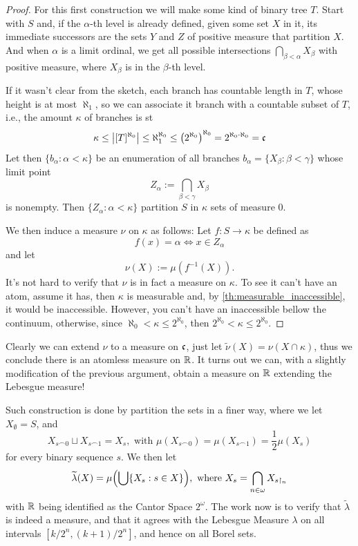 \begin{proof}
    For this first construction we will make some kind of binary tree $T$. Start with $S$ and, if the $\alpha$-th level is already defined, given some set $X$ in it, its immediate successors are the sets $Y$ and $Z$ of positive measure that partition $X$. And when $\alpha$ is a limit ordinal, we get all possible intersections $\bigcap_{\beta<\alpha}X_\beta$ with positive measure, where $X_\beta$ is in the $\beta$-th level.

    If it wasn't clear from the sketch, each branch has countable length in $T$, whose height is at most $\aleph_1$, so we can associate it branch with a countable subset of $T$, i.e., the amount $\kappa$ of branches is st
    $$\kappa\leq\left\lvert[T]^{\aleph_0}\right\rvert\leq\aleph_1^{\aleph_0}\leq{\left(2^{\aleph_0}\right)}^{\aleph_0}=2^{\aleph_0\cdot\aleph_0}=\mathfrak{c}$$
    Let then $\{b_\alpha:\alpha<\kappa\}$ be an enumeration of all branches $b_\alpha=\{X_\beta:\beta<\gamma\}$ whose limit point
    $$Z_\alpha:=\bigcap_{\beta<\gamma}X_\beta$$
    is nonempty. Then $\{Z_\alpha:\alpha<\kappa\}$ partition $S$ in $\kappa$ sets of measure $0$.
    
    We then induce a measure $\nu$ on $\kappa$ as follows: Let $f:S\to\kappa$ be defined as
    $$f(x)=\alpha\iff x\in Z_\alpha$$
    and let
    $$\nu(X):=\mu(f^{-1}(X)).$$
    It's not hard to verify that $\nu$ is in fact a measure on $\kappa$. To see it can't have an atom, assume it has, then $\kappa$ is measurable and, by \cref{th:measurable_inaccessible}, it would be inaccessible. However, you can't have an inaccessible bellow the continuum, otherwise, since $\aleph_0<\kappa\leq2^{\aleph_0}$, then $2^{\aleph_0}<\kappa\leq2^{\aleph_0}$.
\end{proof}

Clearly we can extend $\nu$ to a measure on $\mathfrak{c}$, just let $\widetilde{\nu}(X)=\nu(X\cap\kappa)$, thus we conclude there is an atomless measure on $\mathbb{R}$. It turns out we can, with a slightly modification of the previous argument, obtain a measure on $\mathbb{R}$ extending the Lebesgue measure!

Such construction is done by partition the sets in a finer way, where we let $X_\emptyset=S$, and
$$X_{s\frown0}\sqcup X_{s\frown1}=X_s,\text{ with }\mu(X_{s\frown0})=\mu(X_{s\frown1})=\frac12\mu(X_s)$$
for every binary sequence $s$. We then let
$$\widetilde{\lambda}(X)=\mu{\left(\bigcup\{X_s:s\in X\}\right)},\text{ where }X_s=\bigcap_{n\in\omega}X_{s\restriction_n}$$
with $\mathbb{R}$ being identified as the Cantor Space $2^\omega$. The work now is to verify that $\widetilde{\lambda}$ is indeed a measure, and that it agrees with the Lebesgue Measure $\lambda$ on all intervals $[k/2^n,(k+1)/2^n]$, and hence on all Borel sets.

